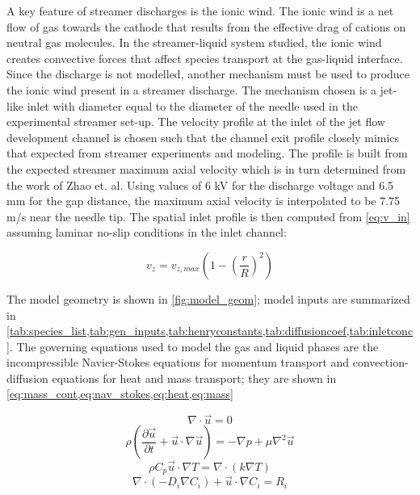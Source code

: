 A key feature of streamer discharges is the ionic wind. The ionic wind is a net flow of gas towards the cathode that results from the effective drag of cations on neutral gas molecules. In the streamer-liquid system studied, the ionic wind creates convective forces that affect species transport at the gas-liquid interface. Since the discharge is not modelled, another mechanism must be used to produce the ionic wind present in a streamer discharge. The mechanism chosen is a jet-like inlet with diameter equal to the diameter of the needle used in the experimental streamer set-up. The velocity profile at the inlet of the jet flow development channel is chosen such that the channel exit profile closely mimics that expected from streamer experiments and modeling. \cite{Zhao2005a} The profile is built from the expected streamer maximum axial velocity which is in turn determined from the work of Zhao et. al. Using values of 6 kV for the discharge voltage and 6.5 mm for the gap distance, the maximum axial velocity is interpolated to be 7.75 m/s near the needle tip. The spatial inlet profile is then computed from \cref{eq:v_in} assuming laminar no-slip conditions in the inlet channel: \cite{bird2007transport}

\begin{equation}
    v_{z} = v_{z,max}\left(1-\left(\frac{r}{R}\right)^2\right)
    \label{eq:v_in}
\end{equation}

 The model geometry is shown in \cref{fig:model_geom}; model inputs are summarized in \cref{tab:species_list,tab:gen_inputs,tab:henryconstants,tab:diffusioncoef,tab:inletconc}. The governing equations used to model the gas and liquid phases are the incompressible Navier-Stokes equations for momentum transport and convection-diffusion equations for heat and mass transport; they are shown in \cref{eq:mass_cont,eq:nav_stokes,eq:heat,eq:mass}

\begin{equation}
    \nabla\cdot\vec{u}=0
    \label{eq:mass_cont}
\end{equation}
\begin{equation}
    \rho \left(\frac{\partial\vec{u}}{\partial t}+\vec{u}\cdot\nabla\vec{u}\right)=-\nabla p+\mu \nabla^2 \vec{u}
    \label{eq:nav_stokes}
\end{equation}
\begin{equation}
    \rho C_p\vec{u}\cdot\nabla T = \nabla\cdot\left(k\nabla T\right)
    \label{eq:heat}
\end{equation}
\begin{equation}
    \nabla\cdot\left(-D_i\nabla C_i\right) + \vec{u}\cdot\nabla C_i = R_i
    \label{eq:mass}
\end{equation}

